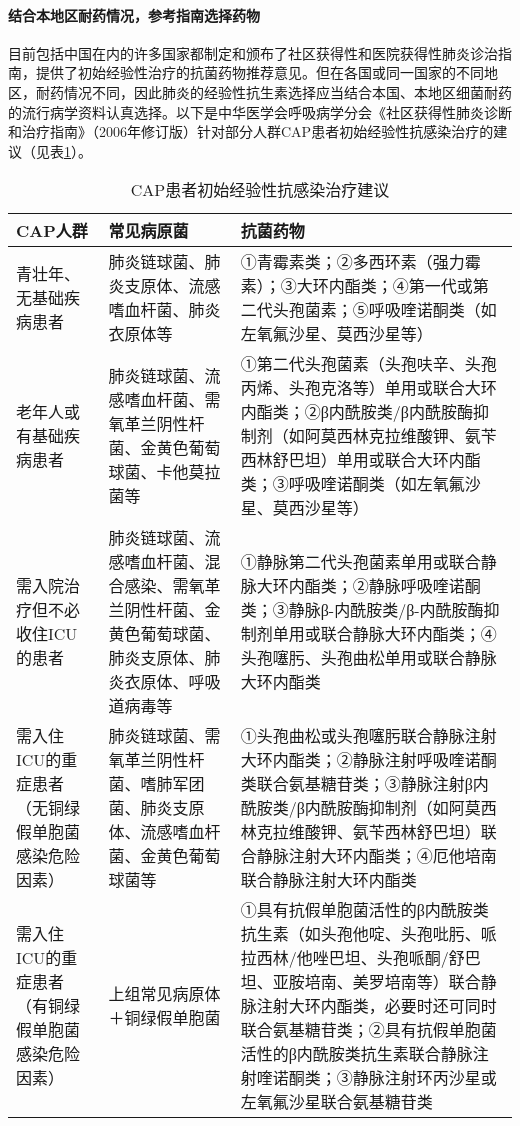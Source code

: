 \paragraph{结合本地区耐药情况，参考指南选择药物}

目前包括中国在内的许多国家都制定和颁布了社区获得性和医院获得性肺炎诊治指南，提供了初始经验性治疗的抗菌药物推荐意见。但在各国或同一国家的不同地区，耐药情况不同，因此肺炎的经验性抗生素选择应当结合本国、本地区细菌耐药的流行病学资料认真选择。以下是中华医学会呼吸病学分会《社区获得性肺炎诊断和治疗指南》（2006年修订版）针对部分人群CAP患者初始经验性抗感染治疗的建议（见表\ref{tab12-1}）。

\begin{longtable}[]{p{4cm}p{4cm}p{4cm}}
    \caption{CAP患者初始经验性抗感染治疗建议}
    \label{tab12-1}\\
\toprule
\endhead
CAP人群 & 常见病原菌 & 抗菌药物\tabularnewline
\midrule
青壮年、无基础疾病患者 &
肺炎链球菌、肺炎支原体、流感嗜血杆菌、肺炎衣原体等 &
①青霉素类；②多西环素（强力霉素）；③大环内酯类；④第一代或第二代头孢菌素；⑤呼吸喹诺酮类（如左氧氟沙星、莫西沙星等）\tabularnewline
老年人或有基础疾病患者 &
肺炎链球菌、流感嗜血杆菌、需氧革兰阴性杆菌、金黄色葡萄球菌、卡他莫拉菌等
&
①第二代头孢菌素（头孢呋辛、头孢丙烯、头孢克洛等）单用或联合大环内酯类；②β内酰胺类/β内酰胺酶抑制剂（如阿莫西林克拉维酸钾、氨苄西林舒巴坦）单用或联合大环内酯类；③呼吸喹诺酮类（如左氧氟沙星、莫西沙星等）\tabularnewline
需入院治疗但不必收住ICU的患者 &
肺炎链球菌、流感嗜血杆菌、混合感染、需氧革兰阴性杆菌、金黄色葡萄球菌、肺炎支原体、肺炎衣原体、呼吸道病毒等
&
①静脉第二代头孢菌素单用或联合静脉大环内酯类；②静脉呼吸喹诺酮类；③静脉β-内酰胺类/β-内酰胺酶抑制剂单用或联合静脉大环内酯类；④头孢噻肟、头孢曲松单用或联合静脉大环内酯类\tabularnewline
需入住ICU的重症患者（无铜绿假单胞菌感染危险因素）
&
肺炎链球菌、需氧革兰阴性杆菌、嗜肺军团菌、肺炎支原体、流感嗜血杆菌、金黄色葡萄球菌等
&
①头孢曲松或头孢噻肟联合静脉注射大环内酯类；②静脉注射呼吸喹诺酮类联合氨基糖苷类；③静脉注射β内酰胺类/β内酰胺酶抑制剂（如阿莫西林克拉维酸钾、氨苄西林舒巴坦）联合静脉注射大环内酯类；④厄他培南联合静脉注射大环内酯类\tabularnewline
需入住ICU的重症患者（有铜绿假单胞菌感染危险因素） & 上组常见病原体＋铜绿假单胞菌 &
①具有抗假单胞菌活性的β内酰胺类抗生素（如头孢他啶、头孢吡肟、哌拉西林/他唑巴坦、头孢哌酮/舒巴坦、亚胺培南、美罗培南等）联合静脉注射大环内酯类，必要时还可同时联合氨基糖苷类；②具有抗假单胞菌活性的β内酰胺类抗生素联合静脉注射喹诺酮类；③静脉注射环丙沙星或左氧氟沙星联合氨基糖苷类\tabularnewline
\bottomrule
\end{longtable}

